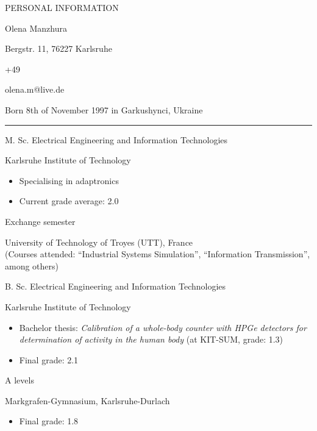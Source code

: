 \documentclass[a4paper,10pt]{article}
\newlength{\cvcolumngapwidth}
\newlength{\cvleftcolumnwidth}
\newlength{\cvrightcolumnwidth}
\newcommand{\cvnamestyle}[1]{{\Large\textcolor{cvnamecolor}{#1}}}
\newcommand{\cvsectionstyle}[1]{{\normalsize\textcolor{cvsectioncolor}{#1}}}
\newcommand{\cvtitlestyle}[1]{{\large\textcolor{cvtitlecolor}{#1}}}
\newcommand{\cvdurationstyle}[1]{{\small\textcolor{cvdurationcolor}{#1}}}
\newlength{\cvafteritemskipamount}
\newlength{\cvaftersectionskipamount}
\newlength{\cvafternameskipamount}
\newlength{\cvafterpersonalinfolineskipamount}
\newlength{\cvaftertitleskipamount}
\newlength{\cvparskip}
\newcommand{\cvpersonalinfo}[2]{
    \begin{minipage}[t]{\cvleftcolumnwidth}
        \vspace{0mm} %
        \raggedleft #1
    \end{minipage}%
    \hspace{\cvcolumngapwidth}%
    \begin{minipage}[t]{\cvrightcolumnwidth}
        \vspace{0mm} %
        #2
    \end{minipage}

    \vspace{\cvafteritemskipamount}
}
\newcommand{\cvname}[1]{
    \cvnamestyle{#1}

    \vspace{\cvafternameskipamount}
}
\newcommand{\cvpersonalinfolinewithicon}[3]{
    \raisebox{.5\fontcharht\font`E-.5\height}{\texttt{[image: \#2]}}
    #3

    \vspace{\cvafterpersonalinfolineskipamount}
}
\newcommand{\cvsection}[1]{
    \begin{minipage}[t][][b]{\cvleftcolumnwidth}
        \raggedleft\cvsectionstyle{#1}
    \end{minipage}%
    \hspace{\cvcolumngapwidth}%
    \begin{minipage}[t]{\cvrightcolumnwidth}
        \textcolor{cvrulecolor}{\rule{\cvrightcolumnwidth}{0.3mm}}
    \end{minipage}

    \vspace{\cvaftersectionskipamount}
}
\newcommand{\cvitem}[2]{
    \begin{minipage}[t]{\cvleftcolumnwidth}
    \strut\vspace*{-\baselineskip}\newline %
    \raggedleft #1
    \end{minipage}%
    \hspace{\cvcolumngapwidth}%
    \begin{minipage}[t]{\cvrightcolumnwidth}
        \setlength{\parskip}{\cvparskip}
        \strut\vspace*{-\baselineskip}\newline #2 %
    \end{minipage}

    \vspace{\cvafteritemskipamount}
}
\newcommand{\cvtitle}[1]{
    \cvtitlestyle{#1}

    \vspace{\cvaftertitleskipamount}
    \vspace{-\cvparskip}
}
\begin{document}
\cvpersonalinfo{
    \cvsectionstyle{PERSONAL INFORMATION}
}{
    \cvname{Olena Manzhura}

    \cvpersonalinfolinewithicon{height=4mm}{resources/europasscv-icons/address_europass_icon.pdf}{
        Bergstr. 11, 76227 Karlsruhe
    }

    \cvpersonalinfolinewithicon{height=4mm}{resources/europasscv-icons/mobile_europass_icon.pdf}{
        +49\;176\;232\;041\;82
    }

    \cvpersonalinfolinewithicon{height=4mm}{resources/europasscv-icons/mail_europass_icon.pdf}{
        olena.m@live.de
    }


    Born 8th of November 1997 in Garkushynci, Ukraine
}

\cvsection{EDUCATION}
\cvitem{\cvdurationstyle{2018 -- now}}{\cvtitle{M. Sc. Electrical Engineering and Information Technologies}
    Karlsruhe Institute of Technology
    \begin{itemize}[leftmargin=*]
        \item Specialising in adaptronics
        \item Current grade average: 2.0
    \end{itemize}
}

\cvitem{\cvdurationstyle{January 2020 -- June 2020}}{\cvtitle{Exchange semester}
	University of Technology of Troyes (UTT), France \\
	(Courses attended: ``Industrial Systems Simulation'', ``Information Transmission'', among others)
}

\cvitem{\cvdurationstyle{2015 -- 2018}}{\cvtitle{B. Sc. Electrical Engineering and Information Technologies}
	Karlsruhe Institute of Technology
	\begin{itemize}[leftmargin=*]
		\item Bachelor thesis: \textit{Calibration of a whole-body counter with HPGe detectors for determination of activity
in the human body} (at KIT-SUM, grade: 1.3)
		\item Final grade: 2.1
	\end{itemize}
}

\cvitem{\cvdurationstyle{2007 -- 2015}}{\cvtitle{A levels}
    Markgrafen-Gymnasium, Karlsruhe-Durlach
    \begin{itemize}[leftmargin=*]
        \item Final grade: 1.8
    \end{itemize}
}
\end{document}

